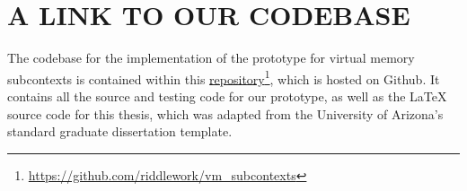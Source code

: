 \documentclass[12pt]{report} %
\begin{document}















\chapter*{A LINK TO OUR CODEBASE}
\thispagestyle{fancy}

The codebase for the implementation of the prototype for virtual memory subcontexts is contained within this \href{https://github.com/riddlework/vm_subcontexts}{repository}\footnote{\href{https://github.com/riddlework/vm_subcontexts}{https://github.com/riddlework/vm\_subcontexts}}, which is hosted on Github. It contains all the source and testing code for our prototype, as well as the LaTeX source code for this thesis, which was adapted from the University of Arizona's standard graduate dissertation template.
\end{document}
